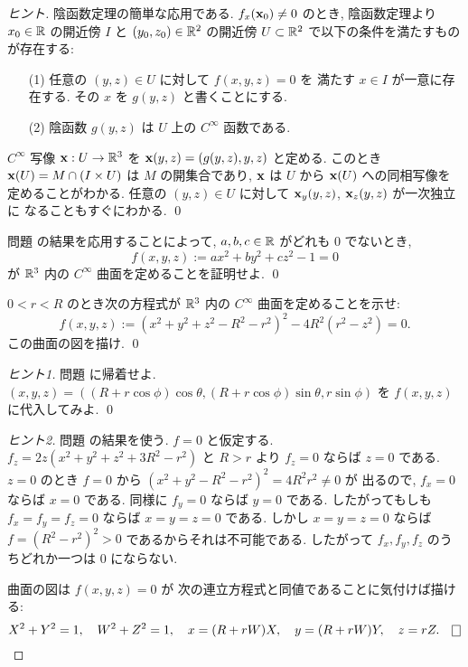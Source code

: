 \documentclass[12pt,twoside]{jarticle}
\begin{document}
\begin{proof}[ヒント]
 陰函数定理の簡単な応用である.
 $f_x({\mathbf x}_0)\ne 0$ のとき, 
 陰函数定理より $x_0\in{\mathbb R}$ の開近傍 $I$ 
 と $(y_0,z_0)\in{\mathbb R}^2$ の開近傍 $U\subset{\mathbb R}^2$ 
 で以下の条件を満たすものが存在する:
 \begin{enumerate}
  \item[(1)] 任意の $(y,z)\in U$ に対して $f(x,y,z)=0$ を
   満たす $x\in I$ が一意に存在する.
   その $x$ を $g(y,z)$ と書くことにする. 
  \item[(2)] 陰函数 $g(y,z)$ は $U$ 上の $C^\infty$ 函数である.
 \end{enumerate}
 $C^\infty$ 写像 ${\mathbf x}:U\to{\mathbb R}^3$ を ${\mathbf x}(y,z)=(g(y,z),y,z)$ と定める.
 このとき ${\mathbf x}(U)=M\cap(I\times U)$ は $M$ の開集合であり, 
 ${\mathbf x}$ は $U$ から ${\mathbf x}(U)$ への同相写像を定めることがわかる.
 任意の $(y,z)\in U$ に対して ${\mathbf x}_y(y,z)$, ${\mathbf x}_z(y,z)$ が一次独立に
 なることもすぐにわかる.
 \qed
\end{proof}

\begin{question}
 問題  の結果を応用することによって, 
 $a,b,c\in{\mathbb R}$ がどれも $0$ でないとき, 
 \[
   f(x,y,z) := ax^2 + by^2 + cz^2 - 1 = 0
 \]
 が ${\mathbb R}^3$ 内の $C^\infty$ 曲面を定めることを証明せよ.
 \qed
\end{question}

\begin{question}[トーラス]
 \label{q:torus2}
 $0<r<R$ のとき次の方程式が ${\mathbb R}^3$ 内の $C^\infty$ 曲面を定めることを示せ:
 \begin{equation*}
  f(x,y,z) := (x^2+y^2+z^2-R^2-r^2)^2 - 4R^2(r^2-z^2) = 0.
 \end{equation*}
 この曲面の図を描け. \qed
\end{question}

\begin{proof}[ヒント1]
 問題  に帰着せよ. 
 $(x,y,z)=((R+r\cos\phi)\cos\theta, (R+r\cos\phi)\sin\theta, r\sin\phi)$
 を $f(x,y,z)$ に代入してみよ.
 \qed
\end{proof}

\begin{proof}[ヒント2]
 問題  の結果を使う.
 $f=0$ と仮定する.
 $f_z=2z(x^2+y^2+z^2+3R^2-r^2)$ と $R>r$ より $f_z=0$ ならば $z=0$ である.
 $z=0$ のとき $f=0$ から $(x^2+y^2-R^2-r^2)^2=4R^2r^2\ne 0$ が
 出るので, $f_x=0$ ならば $x=0$ である.
 同様に $f_y=0$ ならば $y=0$ である.
 したがってもしも $f_x=f_y=f_z=0$ ならば $x=y=z=0$ である.
 しかし $x=y=z=0$ ならば $f=(R^2-r^2)^2>0$ であるからそれは不可能である. 
 したがって $f_x,f_y,f_z$ のうちどれか一つは $0$ にならない.

 曲面の図は $f(x,y,z)=0$ が
 次の連立方程式と同値であることに気付けば描ける:
 \begin{equation*}
  X^2+Y^2=1, \quad
  W^2+Z^2=1, \quad
  x=(R+rW)X, \quad
  y=(R+rW)Y, \quad
  z=rZ.
 \qed
 \end{equation*}
\end{proof}
\end{document}
